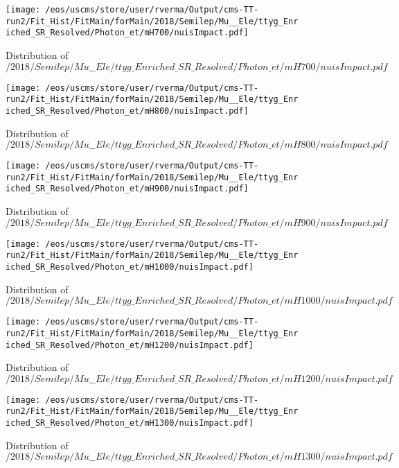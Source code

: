 \begin{figure}
\centering
\texttt{[image: /eos/uscms/store/user/rverma/Output/cms-TT-run2/Fit\_Hist/FitMain/forMain/2018/Semilep/Mu\_\_Ele/ttyg\_Enriched\_SR\_Resolved/Photon\_et/mH700/nuisImpact.pdf]}
\caption{Distribution of $/2018/Semilep/Mu\_\_Ele/ttyg\_Enriched\_SR\_Resolved/Photon\_et/mH700/nuisImpact.pdf$}
\end{figure}

\begin{figure}
\centering
\texttt{[image: /eos/uscms/store/user/rverma/Output/cms-TT-run2/Fit\_Hist/FitMain/forMain/2018/Semilep/Mu\_\_Ele/ttyg\_Enriched\_SR\_Resolved/Photon\_et/mH800/nuisImpact.pdf]}
\caption{Distribution of $/2018/Semilep/Mu\_\_Ele/ttyg\_Enriched\_SR\_Resolved/Photon\_et/mH800/nuisImpact.pdf$}
\end{figure}

\begin{figure}
\centering
\texttt{[image: /eos/uscms/store/user/rverma/Output/cms-TT-run2/Fit\_Hist/FitMain/forMain/2018/Semilep/Mu\_\_Ele/ttyg\_Enriched\_SR\_Resolved/Photon\_et/mH900/nuisImpact.pdf]}
\caption{Distribution of $/2018/Semilep/Mu\_\_Ele/ttyg\_Enriched\_SR\_Resolved/Photon\_et/mH900/nuisImpact.pdf$}
\end{figure}

\begin{figure}
\centering
\texttt{[image: /eos/uscms/store/user/rverma/Output/cms-TT-run2/Fit\_Hist/FitMain/forMain/2018/Semilep/Mu\_\_Ele/ttyg\_Enriched\_SR\_Resolved/Photon\_et/mH1000/nuisImpact.pdf]}
\caption{Distribution of $/2018/Semilep/Mu\_\_Ele/ttyg\_Enriched\_SR\_Resolved/Photon\_et/mH1000/nuisImpact.pdf$}
\end{figure}

\begin{figure}
\centering
\texttt{[image: /eos/uscms/store/user/rverma/Output/cms-TT-run2/Fit\_Hist/FitMain/forMain/2018/Semilep/Mu\_\_Ele/ttyg\_Enriched\_SR\_Resolved/Photon\_et/mH1200/nuisImpact.pdf]}
\caption{Distribution of $/2018/Semilep/Mu\_\_Ele/ttyg\_Enriched\_SR\_Resolved/Photon\_et/mH1200/nuisImpact.pdf$}
\end{figure}

\begin{figure}
\centering
\texttt{[image: /eos/uscms/store/user/rverma/Output/cms-TT-run2/Fit\_Hist/FitMain/forMain/2018/Semilep/Mu\_\_Ele/ttyg\_Enriched\_SR\_Resolved/Photon\_et/mH1300/nuisImpact.pdf]}
\caption{Distribution of $/2018/Semilep/Mu\_\_Ele/ttyg\_Enriched\_SR\_Resolved/Photon\_et/mH1300/nuisImpact.pdf$}
\end{figure}

